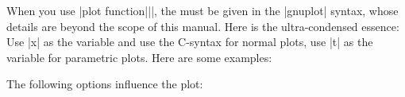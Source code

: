 When you use |plot function{||}|, the  must be given in the |gnuplot| syntax, whose details are
beyond the scope of this manual. Here is the ultra-condensed
essence: Use |x| as the variable and use the C-syntax for normal
plots, use |t| as the variable for parametric plots. Here are some examples:

\begin{codeexample}[]
\end{codeexample}


The following options influence the plot:

